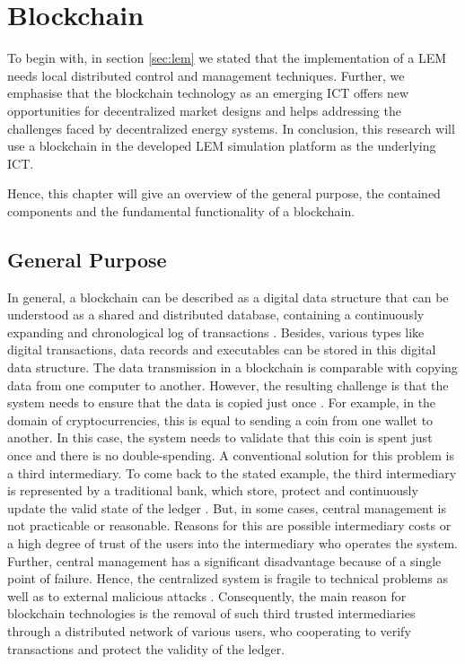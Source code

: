 \section{Blockchain}
\label{sec:about_blockchain}

To begin with, in section \ref{sec:lem} we stated that the implementation of a LEM
needs local distributed control and management techniques. Further, we emphasise
that the blockchain technology as an emerging ICT offers new opportunities for decentralized
market designs and helps addressing the challenges faced by decentralized energy systems. 
In conclusion, this research will use a blockchain in the developed LEM simulation platform 
as the underlying ICT. 

Hence, this chapter will give an overview of the general purpose, 
the contained components and the fundamental functionality of a blockchain. 

\subsection{General Purpose}
In general, a blockchain can be described as a digital data structure that can be understood as a shared and 
distributed database, containing a continuously expanding and chronological log of transactions . 
Besides, various types like digital transactions, data records and executables can be stored in this digital data structure. 
The data transmission in a blockchain is comparable with copying data from one computer to another. However, the resulting challenge 
is that the system needs to ensure that the data is copied just once . 
For example, in the domain of cryptocurrencies, this is equal to sending a coin from one wallet to another. 
In this case, the system needs to validate that this coin is spent just once and there is no double-spending. 
A conventional solution for this problem is a third intermediary. To come back to the stated example, the third 
intermediary is represented by a traditional bank, which store, protect and continuously update the valid state of 
the ledger . But, in some cases, central management is not practicable or reasonable. 
Reasons for this are possible intermediary costs or a high degree of trust of the users into the intermediary who operates 
the system. Further, central management has a significant disadvantage because of a single point of failure. 
Hence, the centralized system is fragile to technical problems as well as to external malicious attacks .
Consequently, the main reason for blockchain technologies is the removal of such third 
trusted intermediaries through a distributed network of various users, who cooperating 
to verify transactions and protect the validity of the ledger.

